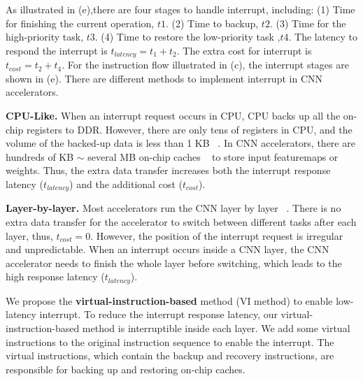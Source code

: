 As illustrated in (e),there are four stages to handle interrupt, including: (1) Time for finishing the current operation, $t1$. (2) Time to backup, $t2$. (3) Time for the high-priority task, $t3$. (4) Time to restore the low-priority task ,$t4$. 
The latency to respond the interrupt is $t_{latency} = t_1+t_2$. The extra cost for interrupt is $t_{cost}=t_2+t_4$. For the instruction flow illustrated in (c), the interrupt stages are shown in (e).
There are different methods to implement interrupt in CNN accelerators.

\textbf{CPU-Like.}
When an interrupt request occurs in CPU, CPU backs up all the on-chip registers to DDR. However, there are only tens of registers in CPU, and the volume of the backed-up data is less than 1 KB  ~\cite{furber2000arm}. In CNN accelerators, there are hundreds of KB $\sim$ several MB on-chip caches  ~\cite{qiu2016going, guo2017angel} to store input featuremaps or weights. 
Thus, the extra data transfer increases both the interrupt response latency ($t_{latency}$) and the additional cost ($t_{cost}$).

\textbf{Layer-by-layer.}
Most accelerators run the CNN layer by layer  ~\cite{qiu2016going,guo2017angel}. 
There is no extra data transfer for the accelerator to switch between different tasks after each layer, thus, $t_{cost}=0$. 
However, the position of the interrupt request is irregular and unpredictable. When an interrupt occurs inside a CNN layer, the CNN accelerator needs to finish the whole layer before switching, which leads to the high response latency ($t_{latency}$).




We propose the \textbf{virtual-instruction-based} method (VI method) to enable low-latency interrupt. 
To reduce the interrupt response latency, our virtual-instruction-based method is interruptible inside each layer. We add some virtual instructions to the original instruction sequence to enable the interrupt.
The virtual instructions, which contain the backup and recovery instructions, are responsible for backing up and restoring on-chip caches. 

